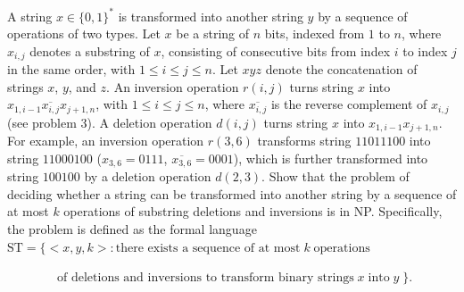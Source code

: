\documentclass[11pt]{amsart}
\begin{document}
A string $x \in \{ 0, 1 \}^*$ is transformed into another string $y$ by a sequence of operations of two types. Let $x$ be a string of $n$ bits, indexed from $1$ to $n$, where $x_{i,j}$ denotes a substring of $x$, consisting of consecutive bits from index $i$ to index $j$ in the same order, with $1 \leq i \leq j \leq n$. Let $xyz$ denote the concatenation of strings $x$, $y$, and $z$. An inversion operation $r(i,j)$ turns string $x$ into $x_{1, i-1} \overline{x_{i, j}} x_{j+1, n}$, with $1 \leq i \leq j \leq n$, where $\overline{x_{i, j}}$ is the reverse complement of $x_{i, j}$ (see problem 3). A deletion operation $d(i,j)$ turns string $x$ into $x_{1, i-1} x_{j+1, n}$. For example, an inversion operation $r(3, 6)$ transforms string $11011100$ into string $11000100$ ($x_{3, 6} = 0111$, $\overline{x_{3, 6}} = 0001$), which is further transformed into string $100100$ by a deletion operation $d(2, 3)$.
Show that the problem of deciding whether a string can be
transformed into another string by a sequence of at most $k$ operations of
substring deletions and inversions is in NP. Specifically, the problem is defined
as the formal language \\

$\textrm{ST} = \{ <x, y, k>: \textrm{there exists a sequence of at most}\; k \; \textrm{operations}$

$\qquad \qquad \textrm{of deletions and inversions to transform binary strings}\; x\; \textrm{into}\; y\; \}$. \\
\end{document}
